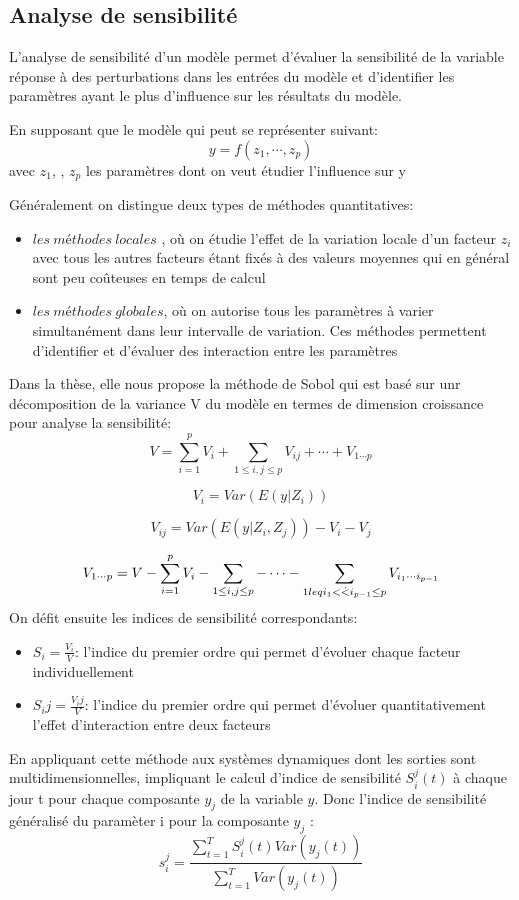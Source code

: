 \subsection{Analyse de sensibilité}
L'analyse de sensibilité d'un modèle permet d'évaluer la sensibilité de      la variable réponse à des perturbations dans les entrées du modèle et d'identifier les paramètres ayant le plus d'influence sur les résultats du modèle.

En supposant que le modèle qui peut se représenter suivant:
\[ {y}=f(z_1, \cdots,z_p)\]
avec $z_1$, \cdots , $z_p$ les paramètres dont on veut étudier l'influence sur y

Généralement on distingue deux types de méthodes quantitatives:
\begin{itemize}
\item $les\ méthodes\ locales$ , où on étudie l'effet de la variation locale d'un facteur $z_i$ avec tous les autres facteurs étant fixés à des valeurs moyennes qui en général sont peu coûteuses en temps de calcul
\item $les\ méthodes\ globales$, où on autorise tous les paramètres à varier simultanément dans leur intervalle de variation. Ces méthodes permettent d'identifier et d'évaluer des interaction entre les paramètres
\end{itemize}                                                
Dans la thèse, elle nous propose la méthode de Sobol qui est basé sur unr décomposition de la variance V du modèle en termes de dimension croissance pour analyse la sensibilité:
\[ {V}=\sum_{i=1}^pV_i+\sum_{1\leq i,j \leq p} V_{ij}+\cdots +V_{1\cdots p}\]

\[ {V_i}=Var(E(y|Z_i))\]

\[ {V_{ij}}=Var(E(y|Z_i,Z_j))-V_i-V_j \]

\[ {V_{1\cdots p}}=V-\sum_{i=1}^p V_i-\sum_{1\leq i,j \leq p}-\cdots -\sum_{1\\leq i_1<\dot <i_{p-1}\leq p} V_{i_1 \cdots i_{p-1}} \]
On défit ensuite les indices de sensibilité correspondants:
\begin{itemize}
\item $S_i=\frac{V_i}{V}$: l'indice du premier ordre qui permet d'évoluer chaque facteur individuellement
\item $S_ij=\frac{V_ij}{V}$: l'indice du premier ordre qui permet d'évoluer quantitativement l'effet d'interaction entre deux facteurs
\end{itemize}
En appliquant cette méthode aux systèmes dynamiques dont les sorties sont multidimensionnelles, impliquant le calcul d'indice de sensibilité $S_i^j(t)$ à chaque jour t pour chaque composante $y_j$ de la variable $y$.
Donc l'indice de sensibilité généralisé du paramèter i  pour la composante $y_j$ :
\[ {s_i^j}=\frac{\sum_{t=1}^TS_i^j(t)Var(y_j(t))}{\sum_{t=1}^T Var(y_j(t))} \]